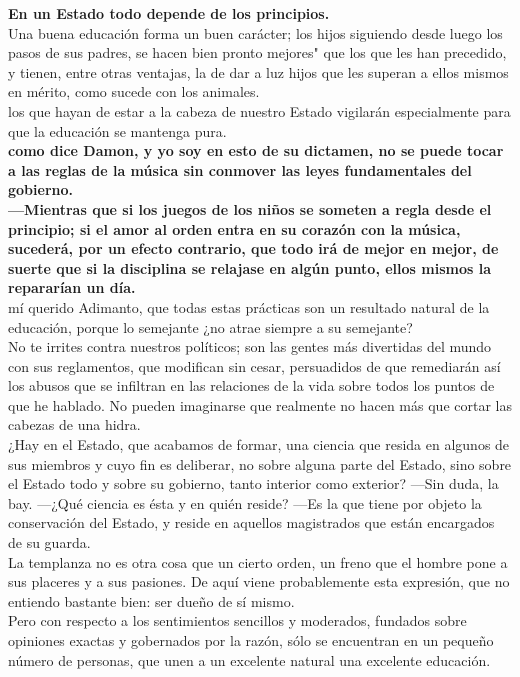 \documentclass[10pt]{book}
\begin{document}
\textbf{En un Estado todo depende de los principios.}\\
Una buena educación forma un buen carácter; los hijos siguiendo desde luego los pasos de sus padres, se hacen bien pronto mejores" que los que les han precedido, y tienen, entre otras ventajas, la de dar a luz hijos que les superan a ellos mismos en mérito, como sucede con los animales. \\
los que hayan de estar a la cabeza de nuestro Estado vigilarán especialmente para que la educación se mantenga pura.\\
\textbf{como dice Damon, y yo soy en esto de su dictamen, no se puede tocar a las reglas de la música sin conmover las leyes fundamentales del gobierno. }\\
\textbf{—Mientras que si los juegos de los niños se someten a regla desde el principio; si el amor al orden entra en su corazón con la música, sucederá, por un efecto contrario, que todo irá de mejor en mejor, de suerte que si la disciplina se relajase en algún punto, ellos mismos la repararían un día. }\\ mí querido Adimanto, que todas estas prácticas son un resultado natural de la educación, porque lo semejante ¿no atrae siempre a su semejante?\\
No te irrites contra nuestros políticos; son las gentes más divertidas del mundo con sus reglamentos, que modifican sin cesar, persuadidos de que remediarán así los abusos que se infiltran en las relaciones de la vida sobre todos los puntos de que he hablado. No pueden imaginarse que realmente no hacen más que cortar las cabezas de una hidra.\\
¿Hay en el Estado, que acabamos de formar, una ciencia que resida en algunos de sus miembros y cuyo fin es deliberar, no sobre alguna parte del Estado, sino sobre el Estado todo y sobre su gobierno, tanto interior como exterior? —Sin duda, la bay. —¿Qué ciencia es ésta y en quién reside? —Es la que tiene por objeto la conservación del Estado, y reside en aquellos magistrados que están encargados de su guarda. \\
 La templanza no es otra cosa que un cierto orden, un freno que el hombre pone a sus placeres y a sus pasiones. De aquí viene probablemente esta expresión, que no entiendo bastante bien: ser dueño de sí mismo.\\
Pero con respecto a los sentimientos sencillos y moderados, fundados sobre opiniones exactas y gobernados por la razón, sólo se encuentran en un pequeño número de personas, que unen a un excelente natural una excelente educación. \\
\end{document}
